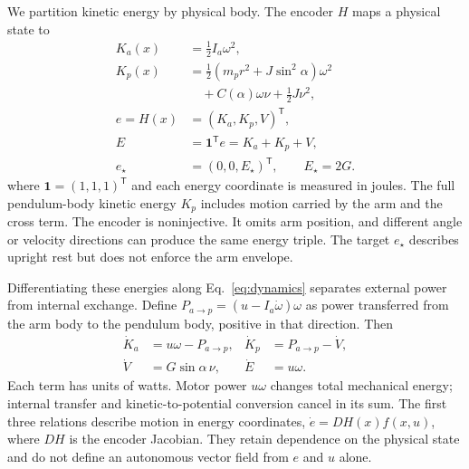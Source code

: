 \documentclass[letterpaper,10pt,conference]{ieeeconf}
\newcommand{\Estar}{E_{\star}}
\begin{document}
We partition kinetic energy by physical body. The encoder $H$ maps a physical state to
\begin{equation}
\begin{aligned}
 K_a(x)&=\tfrac12 I_a\omega^2,\\
 K_p(x)&=\tfrac12(m_p r^2+J\sin^2\alpha)\omega^2\\
       &\quad+C(\alpha)\omega\nu+\tfrac12J\nu^2,\\
 e=H(x)&=(K_a,K_p,V)^{\mathsf T},\\
 E&=\boldsymbol{1}^{\mathsf T}e=K_a+K_p+V,\\
 e_\star&=(0,0,\Estar)^{\mathsf T},\qquad \Estar=2G.
\end{aligned}
\label{eq:encoder}
\end{equation}
where $\boldsymbol{1}=(1,1,1)^{\mathsf T}$ and each energy coordinate is measured in joules. The full pendulum-body kinetic energy $K_p$ includes motion carried by the arm and the cross term. The encoder is noninjective. It omits arm position, and different angle or velocity directions can produce the same energy triple. The target $e_\star$ describes upright rest but does not enforce the arm envelope.

Differentiating these energies along Eq.~\eqref{eq:dynamics} separates external power from internal exchange. Define $P_{a\to p}=(u-I_a\dot\omega)\omega$ as power transferred from the arm body to the pendulum body, positive in that direction. Then
\begin{equation}
\begin{aligned}
 \dot K_a&=u\omega-P_{a\to p}, &\dot K_p&=P_{a\to p}-\dot V,\\
 \dot V&=G\sin\alpha\,\nu, &\dot E&=u\omega.
\end{aligned}
\label{eq:powers}
\end{equation}
Each term has units of watts. Motor power $u\omega$ changes total mechanical energy; internal transfer and kinetic-to-potential conversion cancel in its sum. The first three relations describe motion in energy coordinates, $\dot e=D H(x)f(x,u)$, where $D H$ is the encoder Jacobian. They retain dependence on the physical state and do not define an autonomous vector field from $e$ and $u$ alone.
\end{document}
